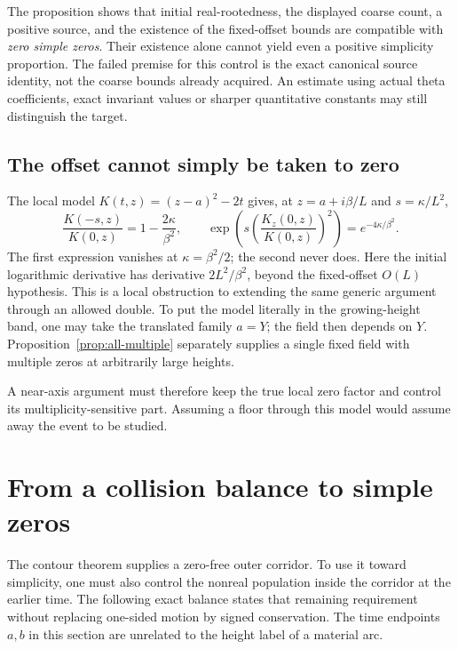 \documentclass[11pt]{article}
\theoremstyle{remark}
\begin{document}
The proposition shows that initial real-rootedness, the displayed coarse
count, a positive source, and the existence of the fixed-offset bounds
are compatible with \emph{zero simple zeros}. Their existence alone
cannot yield even a positive simplicity proportion. The failed premise
for this control is the exact canonical source identity, not the coarse
bounds already acquired. An estimate using actual theta coefficients,
exact invariant values or sharper quantitative constants may
still distinguish the target.

\subsection{The offset cannot simply be taken to zero}

The local model $K(t,z)=(z-a)^2-2t$ gives, at
$z=a+i\beta/L$ and $s=\kappa/L^2$,
\begin{equation}
 \frac{K(-s,z)}{K(0,z)}=1-\frac{2\kappa}{\beta^2},
 \qquad
 \exp\left(s\left(\frac{K_z(0,z)}{K(0,z)}\right)^2\right)
       =e^{-4\kappa/\beta^2}.
 \label{eq:quadratic-obstruction}
\end{equation}
The first expression vanishes at $\kappa=\beta^2/2$; the second never
does. Here the initial logarithmic derivative has derivative
$2L^2/\beta^2$, beyond the fixed-offset $O(L)$ hypothesis. This is a
local obstruction to extending the same generic argument through an
allowed double. To put the model literally in the growing-height band,
one may take the translated family $a=Y$; the field then depends on $Y$.
Proposition~\ref{prop:all-multiple} separately supplies a single fixed
field with multiple zeros at arbitrarily large heights.

A near-axis argument must therefore keep the true local zero factor and
control its multiplicity-sensitive part. Assuming a floor through this
model would assume away the event to be studied.

\section{From a collision balance to simple zeros}
\label{sec:resource}

The contour theorem supplies a zero-free outer corridor. To use it toward
simplicity, one must also control the nonreal population inside the
corridor at the earlier time. The following exact balance states that
remaining requirement without replacing one-sided motion by signed
conservation. The time endpoints $a,b$ in this section are unrelated to
the height label of a material arc.
\end{document}
